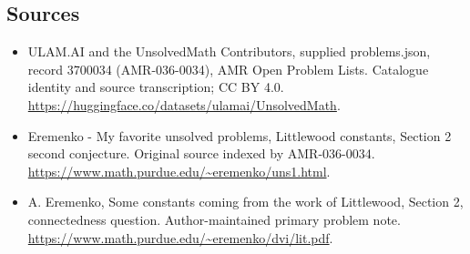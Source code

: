 \documentclass[11pt,a4paper]{article}
\begin{document}
\subsection{Sources}
\begin{itemize}
\item[S1] ULAM.AI and the UnsolvedMath Contributors, supplied problems.json, record 3700034 (AMR-036-0034), AMR Open Problem Lists. Catalogue identity and source transcription; CC BY 4.0.
\url{https://huggingface.co/datasets/ulamai/UnsolvedMath}.
\item[S2] Eremenko - My favorite unsolved problems, Littlewood constants, Section 2 second conjecture. Original source indexed by AMR-036-0034.
\url{https://www.math.purdue.edu/~eremenko/uns1.html}.
\item[S3] A. Eremenko, Some constants coming from the work of Littlewood, Section 2, connectedness question. Author-maintained primary problem note.
\url{https://www.math.purdue.edu/~eremenko/dvi/lit.pdf}.
\end{itemize}
\end{document}
